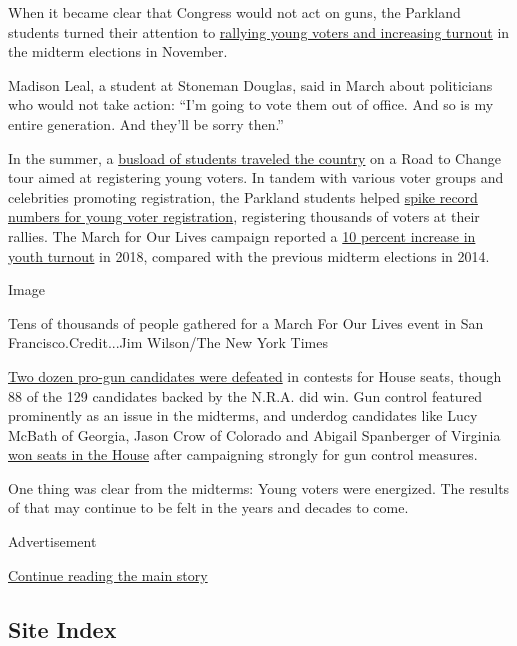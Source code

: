 When it became clear that Congress would not act on guns, the Parkland
students turned their attention to
\href{https://www.nytimes.com/2018/03/22/us/politics/march-for-our-lives-gun-control.html}{rallying
young voters and increasing turnout} in the midterm elections in
November.

Madison Leal, a student at Stoneman Douglas, said in March about
politicians who would not take action: ``I'm going to vote them out of
office. And so is my entire generation. And they'll be sorry then.''

In the summer, a
\href{https://www.nytimes.com/2018/08/15/us/politics/parkland-students-voting.html}{busload
of students traveled the country} on a Road to Change tour aimed at
registering young voters. In tandem with various voter groups and
celebrities promoting registration, the Parkland students helped
\href{https://www.nytimes.com/2018/05/20/us/politics/young-voters-registration-parkland.html}{spike
record numbers for young voter registration}, registering thousands of
voters at their rallies. The March for Our Lives campaign reported a
\href{https://marchforourlives.com/}{10 percent increase in youth
turnout} in 2018, compared with the previous midterm elections in 2014.

Image

Tens of thousands of people gathered for a March For Our Lives event in
San Francisco.Credit...Jim Wilson/The New York Times

\href{https://www.nytimes.com/2018/11/07/us/elections-gun-control-florida.html}{Two
dozen pro-gun candidates were defeated} in contests for House seats,
though 88 of the 129 candidates backed by the N.R.A. did win. Gun
control featured prominently as an issue in the midterms, and underdog
candidates like Lucy McBath of Georgia, Jason Crow of Colorado and
Abigail Spanberger of Virginia
\href{https://www.nytimes.com/2018/11/09/us/politics/gun-control-california-shooting.html}{won
seats in the House} after campaigning strongly for gun control measures.

One thing was clear from the midterms: Young voters were energized. The
results of that may continue to be felt in the years and decades to
come.

Advertisement

\protect\hyperlink{after-bottom}{Continue reading the main story}

\hypertarget{site-index}{%
\subsection{Site Index}\label{site-index}}

